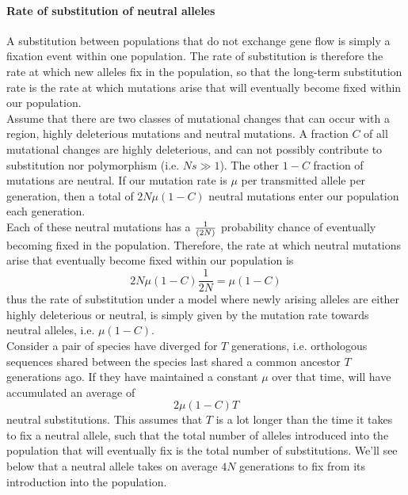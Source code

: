\paragraph{Rate of substitution of neutral alleles}

A substitution between populations that do not exchange gene flow is simply a
fixation event within one population. The rate of substitution is therefore the
rate at which new alleles fix in the population, so that the long-term
substitution rate is the rate at which mutations arise that will eventually
become fixed within our population.\\

Assume that there are two classes of mutational changes that can occur with a
region, highly deleterious mutations and neutral mutations. A fraction $C$ of
all mutational changes are highly deleterious, and can not possibly contribute
to substitution nor polymorphism (i.e. $Ns \gg 1$).  The other $1-C$ fraction
of mutations are neutral. If our mutation rate is $\mu$ per transmitted allele
per generation, then a total of $2N \mu (1-C)$ neutral mutations enter our
population each generation.\\

Each of these neutral mutations has a $\nicefrac{1}{(2N)}$ probability chance of
eventually becoming fixed in the population. Therefore, the rate at
which neutral mutations arise that eventually become fixed within our
population is  
\begin{equation}
2N\mu(1-C)\frac{1}{2N} = \mu(1-C)
\end{equation}
thus the rate of substitution under a model where newly arising alleles are either
highly deleterious or neutral, is simply given by the mutation rate
towards neutral alleles, i.e. $\mu(1-C)$.\\

Consider a pair of species have diverged for $T$ generations, i.e. orthologous sequences shared between the species last shared a common ancestor $T$ generations ago. If they have maintained a constant $\mu$ over that time, will have accumulated an average of
\begin{equation}
2\mu(1-C)T
\end{equation}
neutral substitutions. This assumes that $T$ is a lot longer than the time it
takes to fix a neutral allele, such that the total number of 
alleles introduced into the population that will eventually fix is the
total number of substitutions. We'll see below that a neutral allele
takes on average $4N$ generations to fix from its introduction into
the population.\\

